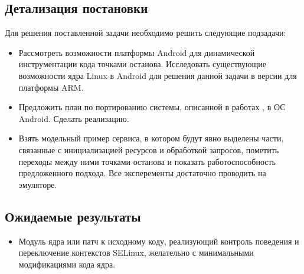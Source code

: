 \subsection{Детализация постановки}
Для решения поставленной задачи необходимо решить следующие подзадачи:
\begin{itemize}
\item Рассмотреть возможности платформы Android для динамической 
инструментации кода точками останова. Исследовать существующие
возможности ядра Linux в Android для решения данной задачи в версии для
платформы ARM.
\item Предложить план по портированию системы, описанной в
    работах \cite{sacharov} \cite{bush}, в ОС Android. Сделать
    реализацию.
\item Взять модельный пример сервиса, в котором будут явно выделены
    части, связанные с инициализацией ресурсов и обработкой запросов,
    пометить переходы между ними точками останова и показать
    работоспособность предложенного подхода. Все эксперементы достаточно
    проводить на эмуляторе.
\end{itemize}

\subsection{Ожидаемые результаты}
\begin{itemize}
\item Модуль ядра или патч к исходному коду, реализующий контроль
    поведения и переключение контекстов SELinux, желательно с
    минимальными модификациями кода ядра.
\end{itemize}
